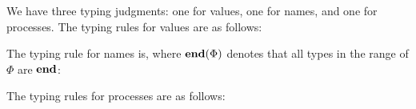 We have three typing judgments: one for values, one for names, and one for processes.
The typing rules for values are as follows:
The typing rule for names is, where $\tend \Phi$ denotes that all types in the range of $\Phi$ are $\Tend$:
\begin{mathpar}
\end{mathpar}
The typing rules for processes are as follows:

